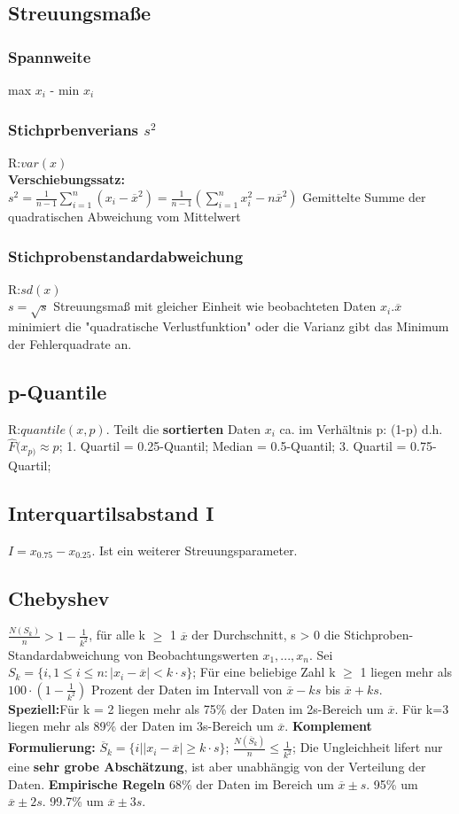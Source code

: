   \subsection{Streuungsmaße}
    \subsubsection{Spannweite}
    max $x_{i}$ - min $x_{i}$
    \subsubsection{Stichprbenverians $s^2$}
    R:$var(x)$\\
    \textbf{Verschiebungssatz:}\\
      $s^2 = \frac{1}{n-1} \sum_{i=1}^{n}(x_{i} - \overline{x}^2) = \frac{1}{n-1} (\sum_{i=1}^{n} x_{i}^2 - n\overline{x}^2)$
      Gemittelte Summe der quadratischen Abweichung vom Mittelwert
      \subsubsection{Stichprobenstandardabweichung}
      R:$sd(x)$\\
      $s=\sqrt{s}$
      Streuungsmaß mit gleicher Einheit wie beobachteten Daten $x_{i}$.$ \overline{x}$ minimiert die "quadratische Verlustfunktion" oder die Varianz gibt das Minimum der Fehlerquadrate an.
      \subsection{p-Quantile}
      R:$quantile(x,p)$. Teilt die \textbf{sortierten} Daten $x_{i}$ ca. im Verhältnis p: (1-p) d.h. $\hat{F}(x_{p)} \approx p$;
      1. Quartil = 0.25-Quantil; 
      Median = 0.5-Quantil; 
      3. Quartil = 0.75-Quartil; 
      \subsection{Interquartilsabstand I}
      $I = x_{0.75} - x_{0.25}$. Ist ein weiterer Streuungsparameter.
      \subsection{Chebyshev}
      $\frac{N(S_{k})}{n} > 1-\frac{1}{k^2}$, für alle k $\geq$ 1
      $\overline{x}$ der Durchschnitt, s > 0 die Stichproben-Standardabweichung von Beobachtungswerten $x_{1}, ..., x_{n}$. Sei $S_{k} = \{i, 1 \leq i \leq n: |x_{i} - \overline{x}| < k \cdot s\}$; Für eine beliebige Zahl k $\geq$ 1 liegen mehr als $100 \cdot (1-\frac{1}{k^2})$ Prozent der Daten im Intervall von $\overline{x} - ks$ bis $ \overline{x} + ks$. \textbf{Speziell:}Für k = 2 liegen mehr als 75\% der Daten im 2s-Bereich um $\overline{x}$. Für k=3 liegen mehr als 89\% der Daten im 3s-Bereich um $\overline{x}$. \textbf{Komplement Formulierung:} $\overline{S}_{k} = \{i | |x_{i}-\overline{x}| \geq k \cdot s\}$; 
      $\frac{N(\overline{S}_{k})}{n} \leq \frac{1}{k^2}$; Die Ungleichheit lifert nur eine \textbf{sehr grobe Abschätzung}, ist aber unabhängig von der Verteilung der Daten. \textbf{Empirische Regeln} 68\% der Daten im Bereich um $\overline{x} \pm s$. 95\% um $\overline{x} \pm 2s$. 99.7\% um $\overline{x} \pm3s$.
